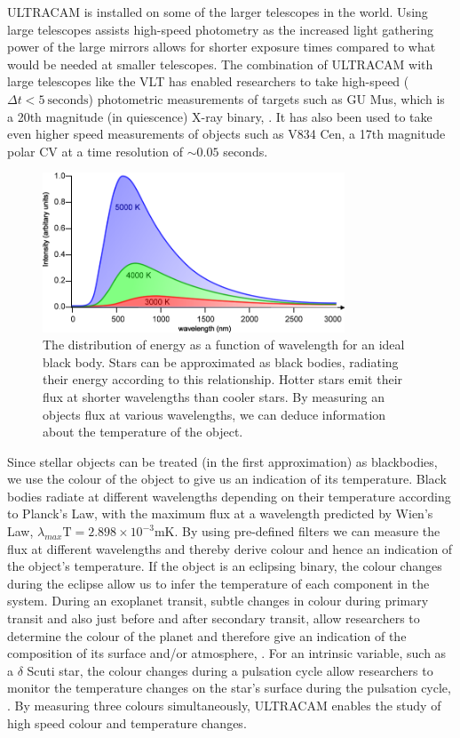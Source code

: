 ULTRACAM is installed on some of the larger telescopes in the world. Using large telescopes assists high-speed photometry as the increased light gathering power of the large mirrors allows for shorter exposure times compared to what would be needed at smaller telescopes. The combination of ULTRACAM with large telescopes like the VLT has enabled researchers to take high-speed ($\Delta t<5~\mbox{seconds}$) photometric measurements of targets such as GU Mus, which is a 20th magnitude (in quiescence) X-ray binary, \citep{tariq2010}. It has also been used to take even higher speed measurements of objects such as V834 Cen, a 17th magnitude polar CV at a time resolution of $\sim 0.05$ seconds.

\begin{figure}
\centering
\includegraphics[width=90mm]{images/wienslaw.png}
\caption[Caption for LOF]{The distribution of energy as a function of wavelength for an ideal black body\protect\footnotemark. Stars can be approximated as black bodies, radiating their energy according to this relationship. Hotter stars emit their flux at shorter wavelengths than cooler stars. By measuring an objects flux at various wavelengths, we can deduce information about the temperature of the object.}
\label{fig:wienslaw}
\end{figure}
Since stellar objects can be treated (in the first approximation) as blackbodies, we use the colour of the object to give us an indication of its temperature. Black bodies radiate at different wavelengths depending on their temperature according to Planck's Law, with the maximum flux at a wavelength predicted by Wien's Law, $\lambda_{max}\mbox{T} = 2.898\times10^{-3}\mbox{mK}$. By using pre-defined filters we can measure the flux at different wavelengths and thereby derive colour and hence an indication of the object's temperature. If the object is an eclipsing binary, the colour changes during the eclipse allow us to infer the temperature of each component in the system. During an exoplanet transit, subtle changes in colour during primary transit and also just before and after secondary transit, allow researchers to determine the colour of the planet and therefore give an indication of the composition of its surface and/or atmosphere, \citep{2012ApJS..201...36B}. For an intrinsic variable, such as a $\delta$ Scuti star, the colour changes during a pulsation cycle allow researchers to monitor the temperature changes on the star's surface during the pulsation cycle, \citep{KurtzBook}. By measuring three colours simultaneously, ULTRACAM enables the study of high speed colour and temperature changes. 

